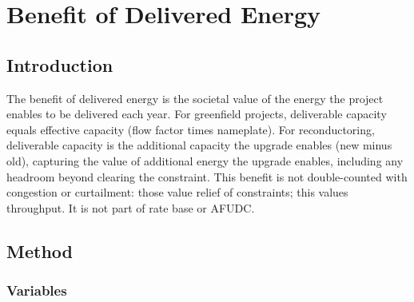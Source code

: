 \documentclass[ctcc_full_documentation.tex]{subfiles}
\begin{document}
\chapter{Benefit of Delivered Energy}

\section{Introduction}

The benefit of delivered energy is the societal value of the energy the project enables to be delivered each year. For greenfield projects, deliverable capacity equals effective capacity (flow factor times nameplate). For reconductoring, deliverable capacity is the additional capacity the upgrade enables (new minus old), capturing the value of additional energy the upgrade enables, including any headroom beyond clearing the constraint. This benefit is not double-counted with congestion or curtailment: those value relief of constraints; this values throughput. It is not part of rate base or AFUDC.

\section{Method}

\subsection{Variables}
\end{document}
